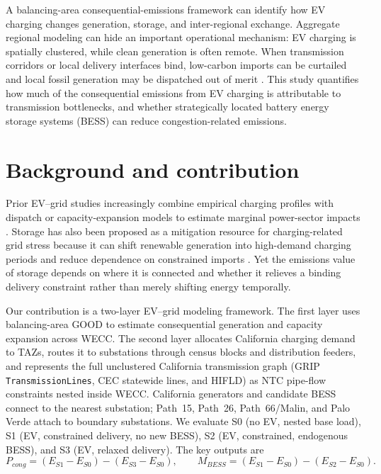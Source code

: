 \documentclass[11pt]{article}
\begin{document}
A balancing-area consequential-emissions framework can identify how EV charging changes generation, storage, and inter-regional exchange. Aggregate regional modeling can hide an important operational mechanism: EV charging is spatially clustered, while clean generation is often remote. When transmission corridors or local delivery interfaces bind, low-carbon imports can be curtailed and local fossil generation may be dispatched out of merit \citep{bird_wind_2016,ahmed_grid_2020}. This study quantifies how much of the consequential emissions from EV charging is attributable to transmission bottlenecks, and whether strategically located battery energy storage systems (BESS) can reduce congestion-related emissions.

\section{Background and contribution}

Prior EV--grid studies increasingly combine empirical charging profiles with dispatch or capacity-expansion models to estimate marginal power-sector impacts \citep{powell_scalable_2022,jenn_environmental_2020,jenn_emissions_2023,bruchon_cleaning_2024}. Storage has also been proposed as a mitigation resource for charging-related grid stress because it can shift renewable generation into high-demand charging periods and reduce dependence on constrained imports \citep{mowry_grid_2021,nagarajan_value_2018,ziegler_storage_2019,sihvonen_techno-socio-economic_2025}. Yet the emissions value of storage depends on where it is connected and whether it relieves a binding delivery constraint rather than merely shifting energy temporally.

Our contribution is a two-layer EV--grid modeling framework. The first layer uses balancing-area GOOD to estimate consequential generation and capacity expansion across WECC. The second layer allocates California charging demand to TAZs, routes it to substations through census blocks and distribution feeders, and represents the full unclustered California transmission graph (GRIP \texttt{TransmissionLines}, CEC statewide lines, and HIFLD) as NTC pipe-flow constraints nested inside WECC. California generators and candidate BESS connect to the nearest substation; Path~15, Path~26, Path~66/Malin, and Palo Verde attach to boundary substations. We evaluate S0 (no EV, nested base load), S1 (EV, constrained delivery, no new BESS), S2 (EV, constrained, endogenous BESS), and S3 (EV, relaxed delivery). The key outputs are
\[
P_{cong}=(E_{S1}-E_{S0})-(E_{S3}-E_{S0}),
\qquad
M_{BESS}=(E_{S1}-E_{S0})-(E_{S2}-E_{S0}).
\]
\end{document}
